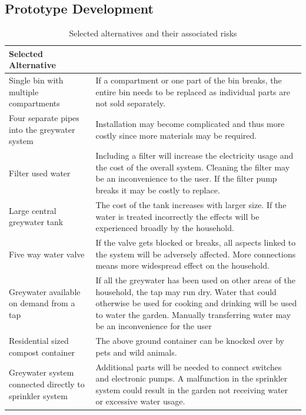 \documentclass[a4paper,11pt,fleqn]{report}
\begin{document}
\subsection{Prototype Development}
%
\begin{table}[h!]
\caption {Selected alternatives and their associated risks} \label{tb: Functional_SS_elements} 
\begin{center}
\begin{tabular}{p{7cm}|p{7cm}}\toprule
	{\textbf{Selected Alternative}} & {\textbf{Associated Risk}\\ \midrule
    \hline
    Single bin with multiple compartments & If a compartment or one part of the bin breaks, the entire bin needs to be replaced as individual parts are not sold separately.\\
        \hline
    Four separate pipes into the greywater system  & Installation may become complicated and thus more costly since more materials may be required.\\
        \hline
    Filter used water & Including a filter will increase the electricity usage and the cost of the overall system. Cleaning the filter may be an inconvenience to the user. If the filter pump breaks it may be costly to replace. \\
        \hline
   Large central greywater tank & The cost of the tank increases with larger size. If the water is treated incorrectly the effects will be experienced broadly by the household. \\
        \hline
    Five way water valve & If the valve gets blocked or breaks, all aspects linked to the system will be adversely affected. More connections means more widespread effect on the household.\\
        \hline
    Greywater available on demand from a tap & If all the greywater has been used on other areas of the household, the tap may run dry. Water that could otherwise be used for cooking and drinking will be used to water the garden. Manually transferring water may be an inconvenience for the user\\
        \hline
    Residential sized compost container & The above ground container can be knocked over by pets and wild animals.\\
        \hline
    Greywater system connected directly to sprinkler system & Additional parts will be needed to connect switches and electronic pumps. A malfunction in the sprinkler system could result in the garden not receiving water or excessive water usage. \\
    \bottomrule
\end{tabular}
\end{center}
\end{table}
%
\end{document}
